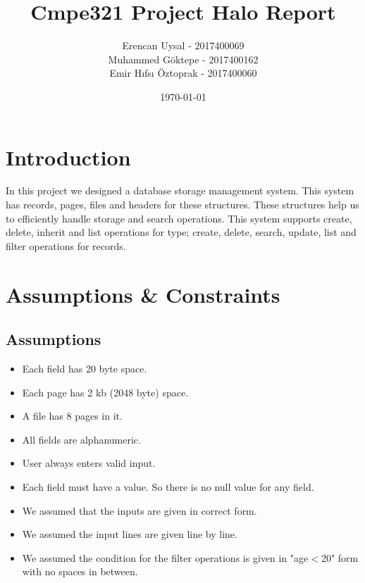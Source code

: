 \documentclass{article}
\title{Cmpe321 Project Halo Report}
\date{\today}
\author{Erencan Uysal - 2017400069\\Muhammed Göktepe - 2017400162 \\ Emir Hıfsı Öztoprak - 2017400060}
\begin{document}
\maketitle
\newpage
\tableofcontents
\newpage
\section{Introduction}
\label{sec:introduction}
In this project we designed a database storage management system. This system has records, pages, files and headers for these structures. These structures help us to efficiently handle storage and search operations. This system supports create, delete, inherit and list operations for type; create, delete, search, update, list and filter operations for records.   
\section{Assumptions \& Constraints}
\label{sec:ass-and-const}
 
\subsection{Assumptions}
\begin{itemize}
    \item Each field has 20 byte space.
    \item Each page has 2 kb (2048 byte) space.
    \item A file has 8 pages in it.
    \item All fields are alphanumeric.
    \item User always enters valid input.
    \item Each field must have a value. So there is no null value for any field.
    \item We assumed that the inputs are given in correct form.
\item We assumed the input lines are given line by line.
\item We assumed the condition for the filter operations is given in "age$<$20" form with no spaces in between.
\end{itemize}
\end{document}
